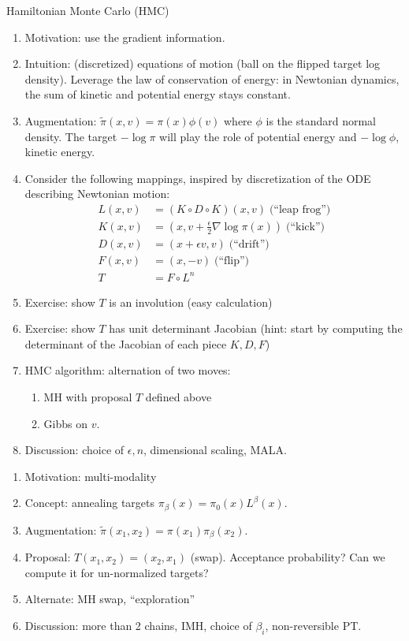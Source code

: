 \documentclass{article}
\begin{document}
 Hamiltonian Monte Carlo (HMC)
\begin{enumerate}
	\item Motivation: use the gradient information. 
	\item Intuition: (discretized) equations of motion (ball on the flipped target log density). Leverage the law of conservation of energy: in Newtonian dynamics, the sum of kinetic and potential energy stays constant.
	\item Augmentation: $\tilde \pi(x, v) = \pi(x) \phi(v)$ where $\phi$ is the standard normal density. The target $- \log \pi$ will play the role of potential energy and $-\log \phi$, kinetic energy. 
	\item Consider the following mappings, inspired by discretization of the ODE describing Newtonian motion: 
	\begin{align*}
	L(x, v) &= (K \circ D \circ K)(x, v) \;\text{(``leap frog'')} \\
	K(x, v) &= (x, v + \frac{\epsilon}{2} \nabla \log \pi(x)) \;\text{(``kick'')}  \\
	D(x, v) &= (x + \epsilon v, v) \;\text{(``drift'')} \\
	F(x, v) &= (x, -v) \;\text{(``flip'')}\\
	T &= F \circ L^n
	\end{align*}
	\item Exercise: show $T$ is an involution (easy calculation)
	\item Exercise: show $T$ has unit determinant Jacobian (hint: start by computing the determinant of the Jacobian of each piece $K, D, F$)
	\item HMC algorithm: alternation of two moves: 
	\begin{enumerate}
		\item MH with proposal $T$ defined above
		\item Gibbs on $v$.
	\end{enumerate}
	\item Discussion: choice of $\epsilon, n$, dimensional scaling, MALA. 
\end{enumerate}

\begin{enumerate}
	\item Motivation: multi-modality
	\item Concept: annealing targets $\pi_\beta(x) = \pi_0(x) L^\beta(x)$. 
	\item Augmentation: $\tilde \pi(x_1, x_2) = \pi(x_1) \pi_\beta(x_2)$. 
	\item Proposal: $T(x_1, x_2) = (x_2, x_1)$ (swap). Acceptance probability? Can we compute it for un-normalized targets?
	\item Alternate: MH swap, ``exploration'' 
	\item Discussion: more than 2 chains, IMH, choice of $\beta_i$, non-reversible PT.  
\end{enumerate}





\end{document}
